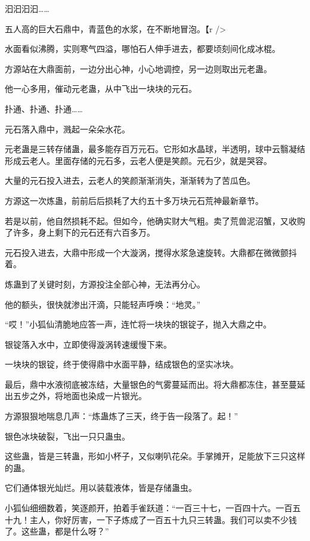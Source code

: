 
\begin{this_body}

汩汩汩汩……

五人高的巨大石鼎中，青蓝色的水浆，在不断地冒泡。【r />

水面看似沸腾，实则寒气四溢，哪怕石人伸手进去，都要顷刻间化成冰棍。

方源站在大鼎面前，一边分出心神，小心地调控，另一边则取出元老蛊。

他一心多用，催动元老蛊，从中飞出一块块的元石。

扑通、扑通、扑通……

元石落入鼎中，溅起一朵朵水花。

元老蛊是三转存储蛊，最多能存百万元石。它形如水晶球，半透明，球中云翳凝结形成云老人。里面存储的元石多，云老人便是笑颜。元石少，就是哭容。

大量的元石投入进去，云老人的笑颜渐渐消失，渐渐转为了苦瓜色。

方源这一次炼蛊，前前后后损耗了大约五十多万块元石荒神最新章节。

若是以前，他自然损耗不起。但如今，他确实财大气粗。卖了荒兽泥沼蟹，又收购了许多，身上剩下的元石还有六百多万。

元石投入进去，大鼎中形成一个大漩涡，搅得水浆急速旋转。大鼎都在微微颤抖着。

炼蛊到了关键时刻，方源投注全部心神，无法再分心。

他的额头，很快就渗出汗滴，只能轻声呼唤：“地灵。”

“哎！”小狐仙清脆地应答一声，连忙将一块块的银锭子，抛入大鼎之中。

银锭落入水中，立即使得漩涡转速缓慢下来。

一块块的银锭，终于使得鼎中水面平静，结成银色的坚实冰块。

最后，鼎中水液彻底被冻结，大量银色的气雾蔓延而出。将大鼎都冻住，甚至蔓延出五步之外，将地面也染成一片银光。

方源狠狠地喘息几声：“炼蛊炼了三天，终于告一段落了。起！”

银色冰块破裂，飞出一只只蛊虫。

这些蛊，皆是三转蛊，形如小杯子，又似喇叭花朵。手掌摊开，足能放下三只这样的蛊。

它们通体银光灿烂。用以装载液体，皆是存储蛊虫。

小狐仙细细数着，笑逐颜开，拍着手雀跃道：“一百三十七，一百四十六。一百五十九！主人，你好厉害，一下子炼成了一百五十九只三转蛊。我们可以卖不少钱了。这些蛊，都是什么呀？”


\end{this_body}
